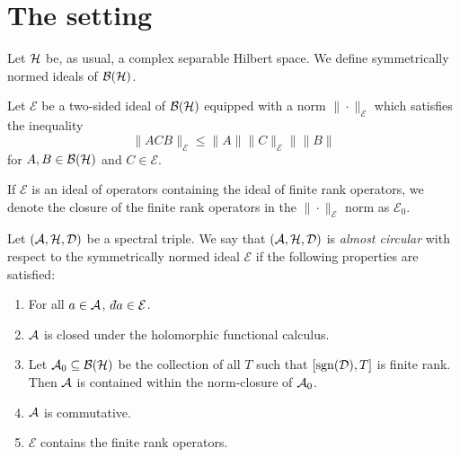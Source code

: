 \section{The setting}
Let $\mathcal{H}$ be, as usual, a complex separable Hilbert space. We
define symmetrically normed ideals of $\mathcal{B}(\mathcal{H})$.
\begin{definition}
    Let $\mathcal{E}$ be a two-sided ideal of $\mathcal{B}(\mathcal{H})$
    equipped with a norm $\|\cdot\|_{\mathcal{E}}$ which satisfies the inequality
    \begin{equation}
        \|ACB\|_{\mathcal{E}} \leq \|A\|\|C\|_\mathcal{E}\|\|B\|
    \end{equation}
    for $A,B \in \mathcal{B}(\mathcal{H})$ and $C \in \mathcal{E}$.
\end{definition}

\begin{definition}
    If $\mathcal{E}$ is an ideal of operators containing the ideal of finite rank
    operators, we denote the closure of the finite rank operators in the $\|\cdot\|_\mathcal{E}$
    norm as $\mathcal{E}_0$.
\end{definition}

\begin{definition}
    Let $(\mathcal{A},\mathcal{H},\mathcal{D})$ be a spectral triple. We say that $(\mathcal{A},\mathcal{H},\mathcal{D})$
    is \emph{almost circular} with respect
    to the symmetrically normed ideal $\mathcal{E}$
     if the following properties are satisfied:
    \begin{enumerate}
        \item{} For all $a \in \mathcal{A}$, $\qd a \in \mathcal{E}$.
        \item{} $\mathcal{A}$ is closed under the holomorphic functional calculus.
        \item{} Let $\mathcal{A}_0 \subseteq \mathcal{B}(\mathcal{H})$ be the collection of all
        $T$ such that $[\operatorname{sgn}(\mathcal{D}),T]$ is finite rank. Then $\mathcal{A}$ is contained
        within the norm-closure of $\mathcal{A}_0$.
        \item{} $\mathcal{A}$ is commutative.
        \item{} $\mathcal{E}$ contains the finite rank operators.
    \end{enumerate}
\end{definition}


